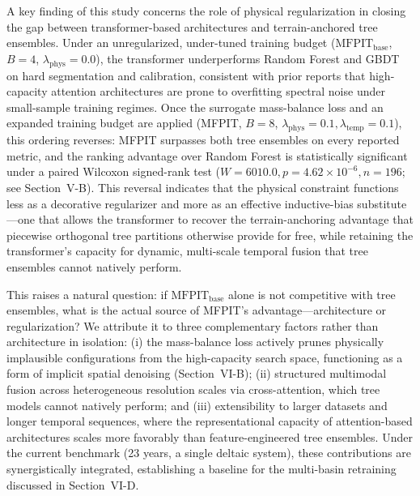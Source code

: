 \documentclass[journal]{IEEEtran}
\begin{document}
A key finding of this study concerns the role of physical regularization in closing the gap between transformer-based architectures and terrain-anchored tree ensembles. Under an unregularized, under-tuned training budget ($\text{MFPIT}_{\text{base}}$, $B=4$, $\lambda_{\text{phys}} = 0.0$), the transformer underperforms Random Forest and GBDT on hard segmentation and calibration, consistent with prior reports that high-capacity attention architectures are prone to overfitting spectral noise under small-sample training regimes. Once the surrogate mass-balance loss and an expanded training budget are applied (MFPIT, $B=8$, $\lambda_{\text{phys}} = 0.1, \lambda_{\text{temp}} = 0.1$), this ordering reverses: MFPIT surpasses both tree ensembles on every reported metric, and the ranking advantage over Random Forest is statistically significant under a paired Wilcoxon signed-rank test ($W = 6010.0, p = 4.62 \times 10^{-6}, n = 196$; see Section~V-B). This reversal indicates that the physical constraint functions less as a decorative regularizer and more as an effective inductive-bias substitute---one that allows the transformer to recover the terrain-anchoring advantage that piecewise orthogonal tree partitions otherwise provide for free, while retaining the transformer's capacity for dynamic, multi-scale temporal fusion that tree ensembles cannot natively perform.

This raises a natural question: if $\text{MFPIT}_{\text{base}}$ alone is not competitive with tree ensembles, what is the actual source of MFPIT's advantage---architecture or regularization? We attribute it to three complementary factors rather than architecture in isolation: (i) the mass-balance loss actively prunes physically implausible configurations from the high-capacity search space, functioning as a form of implicit spatial denoising (Section~VI-B); (ii) structured multimodal fusion across heterogeneous resolution scales via cross-attention, which tree models cannot natively perform; and (iii) extensibility to larger datasets and longer temporal sequences, where the representational capacity of attention-based architectures scales more favorably than feature-engineered tree ensembles. Under the current benchmark (23 years, a single deltaic system), these contributions are synergistically integrated, establishing a baseline for the multi-basin retraining discussed in Section~VI-D.
\end{document}
